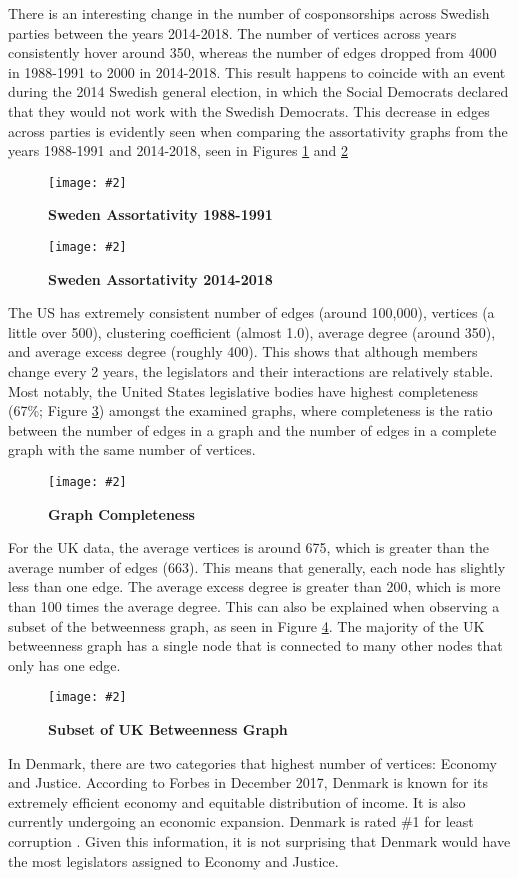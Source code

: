\documentclass[12pt]{article}
\newcommand{\image}[4][0.6]{
  \begin{figure}[H]
    \centering
    \texttt{[image: \#2]}
    \begin{center}
      \caption[(details)]{\textbf{#4}\label{fig:#3}}
    \end{center}
    \vspace{-2em}
  \end{figure}}
\begin{document}
\begin{multicols*}{2}
There is an interesting change in the number of cosponsorships across Swedish parties between the years 2014-2018. The number of vertices across years consistently hover around 350, whereas the number of edges dropped from 4000 in 1988-1991 to 2000 in 2014-2018. This result happens to coincide with an event during the 2014 Swedish general election, in which the Social Democrats declared that they would not work with the Swedish Democrats. This decrease in edges across parties is evidently seen when comparing the assortativity graphs from the years 1988-1991 and 2014-2018, seen in Figures \ref{fig:swe_ass_1988} and \ref{fig:swe_ass_2014}

\image[0.3]{../plots/graph/sweden/assortativity/assortativity_net_se1988-1991.pdf}{swe_ass_1988}{Sweden Assortativity 1988-1991}
\image[0.3]{../plots/graph/sweden/assortativity/assortativity_net_se2014-2018.pdf}{swe_ass_2014}{Sweden Assortativity 2014-2018}

The US has extremely consistent number of edges (around 100,000), vertices (a little over 500), clustering coefficient (almost 1.0), average degree (around 350), and average excess degree (roughly 400). This shows that although members change every 2 years, the legislators and their interactions are relatively stable. Most notably, the United States legislative bodies have highest completeness (67\%; Figure \ref{fig:completeness}) amongst the examined graphs, where completeness is the ratio between the number of edges in a graph and the number of edges in a complete graph with the same number of vertices.

\image[0.3]{../plots/averages/completeness.pdf}{completeness}{Graph Completeness}

For the UK data, the average vertices is around 675, which is greater than the average number of edges (663). This means that generally, each node has slightly less than one edge. The average excess degree is greater than 200, which is more than 100 times the average degree. This can also be explained when observing a subset of the betweenness graph, as seen in Figure \ref{fig:uk-betweenness}. The majority of the UK betweenness graph has a single node that is connected to many other nodes that only has one edge. 

\begin{center}
  \image[0.2]{Images/uk-betweenness.png}{uk-betweenness}{Subset of UK Betweenness Graph}
\end{center}

In Denmark, there are two categories that highest number of vertices: Economy and Justice. According to Forbes in December 2017, Denmark is known for its extremely efficient economy and equitable distribution of income. It is also currently undergoing an economic expansion. Denmark is rated \#1 for least corruption \cite{denmark}. Given this information, it is not surprising that Denmark would have the most legislators assigned to Economy and Justice.


\end{multicols*}
\end{document}

